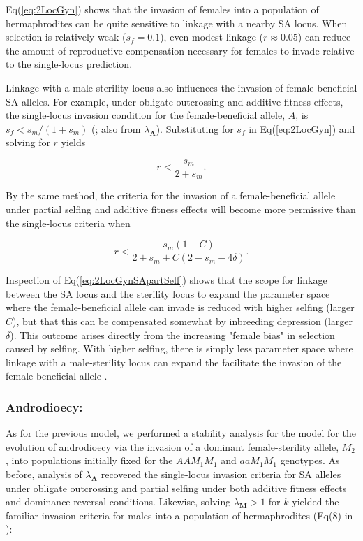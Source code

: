 \documentclass[9pt,twocolumn,twoside,lineno]{gsajnl}
\begin{document}
\noindent Eq(\ref{eq:2LocGyn}) shows that the invasion of females into a population of hermaphrodites can be quite sensitive to linkage with a nearby SA locus. When selection is relatively weak ($s_f = 0.1$), even modest linkage ($r\approx0.05$) can reduce the amount of reproductive compensation necessary for females to invade relative to the single-locus prediction. 

Linkage with a male-sterility locus also influences the invasion of female-beneficial SA alleles. For example, under obligate outcrossing and additive fitness effects, the single-locus invasion condition for the female-beneficial allele, $A$, is $s_f < s_m / (1+s_m)$ (\citealt{Kidwell1977}; also from $\lambda_{\mathbf{A}}$). Substituting for $s_f$ in Eq(\ref{eq:2LocGyn}) and solving for $r$ yields

\begin{equation}\label{eq:2LocGynSA}
	r < \frac{s_m}{2 + s_m}.
\end{equation}

\noindent By the same method, the criteria for the invasion of a female-beneficial allele under partial selfing and additive fitness effects will become more permissive than the single-locus criteria when 

\begin{equation}\label{eq:2LocGynSApartSelf}
	r < \frac{s_m (1 - C)}{2 + s_m +C (2 - s_m - 4 \delta)}.
\end{equation}

\noindent Inspection of Eq(\ref{eq:2LocGynSApartSelf}) shows that the scope for linkage between the SA locus and the sterility locus to expand the parameter space where the female-beneficial allele can invade is reduced with higher selfing (larger $C$), but that this can be compensated somewhat by inbreeding depression (larger $\delta$). This outcome arises directly from the increasing "female bias" in selection caused by selfing. With higher selfing, there is simply less parameter space where linkage with a male-sterility locus can expand the facilitate the invasion of the female-beneficial allele \citep{JordanConnallon2014,Olito2017}.

\subsubsection{Androdioecy:} As for the previous model, we performed a stability analysis for the model for the evolution of androdioecy via the invasion of a dominant female-sterility allele, $M_2$, into populations initially fixed for the $AAM_1M_1$ and $aaM_1M_1$ genotypes. As before, analysis of $\lambda_{\mathbf{A}}$ recovered the single-locus invasion criteria for SA alleles under obligate outcrossing and partial selfing under both additive fitness effects and dominance reversal conditions. Likewise, solving $\lambda_{\mathbf{M}} > 1$ for $k$ yielded the familiar invasion criteria for males into a population of hermaphrodites (Eq(8) in \citealt{Charlesworth1978a}):
\end{document}

